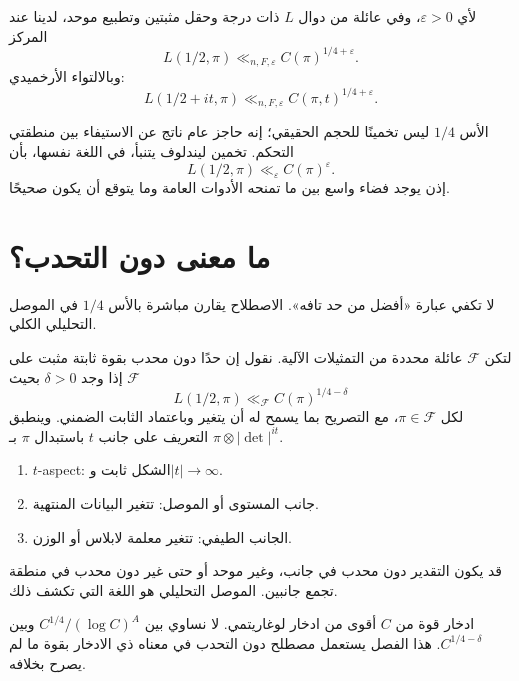 \begin{theorem}[حد التحدب]
\label{thm:ch21-convexity-bound}
لأي \(\varepsilon>0\)، وفي عائلة من دوال \(L\) ذات درجة وحقل
مثبتين وتطبيع موحد، لدينا عند المركز
\[
L(1/2,\pi)
\ll_{n,F,\varepsilon}
C(\pi)^{1/4+\varepsilon}.
\]
وبالالتواء الأرخميدي:
\[
L(1/2+it,\pi)
\ll_{n,F,\varepsilon}
C(\pi,t)^{1/4+\varepsilon}.
\]
\end{theorem}

الأس \(1/4\) ليس تخمينًا للحجم الحقيقي؛ إنه حاجز عام ناتج عن
الاستيفاء بين منطقتي التحكم. تخمين ليندلوف يتنبأ، في اللغة نفسها، بأن
\[
L(1/2,\pi)\ll_{\varepsilon}C(\pi)^\varepsilon.
\]
إذن يوجد فضاء واسع بين ما تمنحه الأدوات العامة وما يتوقع أن يكون
صحيحًا.

\section{ما معنى دون التحدب؟}

لا تكفي عبارة «أفضل من حد تافه». الاصطلاح يقارن مباشرة بالأس
\(1/4\) في الموصل التحليلي الكلي.

\begin{definition}
\label{def:ch21-subconvexity}
\provedhere
لتكن \(\mathcal F\) عائلة محددة من التمثيلات الآلية. نقول إن حدًا
دون محدب بقوة ثابتة مثبت على \(\mathcal F\) إذا وجد \(\delta>0\)
بحيث
\[
L(1/2,\pi)
\ll_{\mathcal F}
C(\pi)^{1/4-\delta}
\]
لكل \(\pi\in\mathcal F\)، مع التصريح بما يسمح له أن يتغير وباعتماد
الثابت الضمني. وينطبق التعريف على جانب \(t\) باستبدال \(\pi\) بـ
\(\pi\otimes|\det|^{it}\).
\end{definition}

\begin{remark}
\begin{enumerate}
  \item \textenglish{\(t\)-aspect}: الشكل ثابت و\(|t|\to\infty\).
  \item جانب المستوى أو الموصل: تتغير البيانات المنتهية.
  \item الجانب الطيفي: تتغير معلمة لابلاس أو الوزن.
\end{enumerate}
قد يكون التقدير دون محدب في جانب، وغير موحد أو حتى غير دون محدب في
منطقة تجمع جانبين. الموصل التحليلي هو اللغة التي تكشف ذلك.
\end{remark}

\begin{remark}
ادخار قوة من \(C\) أقوى من ادخار لوغاريتمي. لا نساوي بين
\(C^{1/4}/(\log C)^A\) وبين \(C^{1/4-\delta}\). هذا الفصل يستعمل
مصطلح دون التحدب في معناه ذي الادخار بقوة ما لم يصرح بخلافه.
\end{remark}

